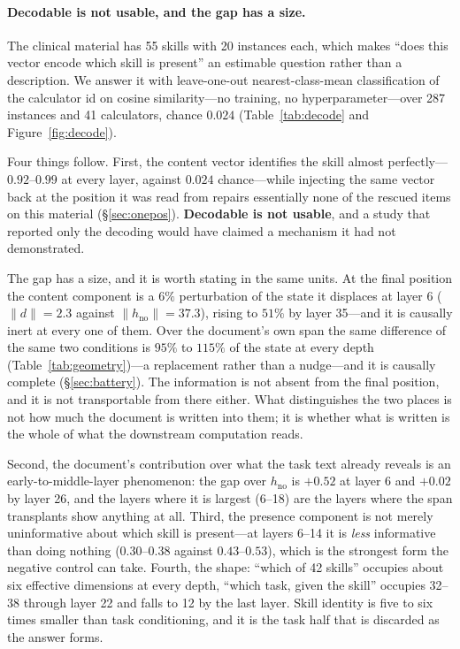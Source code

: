 \documentclass{article}
\newcommand{\dvec}{\ensuremath{d}}
\begin{document}
\paragraph{Decodable is not usable, and the gap has a size.} The clinical
material has 55 skills with
20 instances each, which makes ``does this vector encode which skill is
present'' an estimable question rather than a description. We answer it with
leave-one-out nearest-class-mean classification of the calculator id on cosine
similarity---no training, no hyperparameter---over 287 instances and 41
calculators, chance $0.024$ (Table~\ref{tab:decode} and
Figure~\ref{fig:decode}).





Four things follow. First, the content vector identifies the skill almost
perfectly---$0.92$--$0.99$ at every layer, against $0.024$ chance---while
injecting the same vector back at the position it was read from repairs
essentially none of the rescued items on this material (\S\ref{sec:onepos}).
\textbf{Decodable is not usable}, and a study that reported only the decoding
would have claimed a mechanism it had not demonstrated.

The gap has a size, and it is worth stating in the same units. At the final
position the content component is a $6\%$ perturbation of the state it displaces
at layer 6 ($\|\dvec\|=2.3$ against $\|h_{\text{no}}\|=37.3$), rising to $51\%$
by layer 35---and it is causally inert at every one of them. Over the document's
own span the same difference of the same two conditions is $95\%$ to $115\%$ of
the state at every depth (Table~\ref{tab:geometry})---a replacement rather than a
nudge---and it is causally complete (\S\ref{sec:battery}). The information is not
absent from the final position, and it is not transportable from there either.
What distinguishes the two places is not how much the document is written into
them; it is whether what is written is the whole of what the downstream
computation reads.

Second, the document's contribution over what the task text
already reveals is an early-to-middle-layer phenomenon: the gap over
$h_{\text{no}}$ is $+0.52$ at layer 6 and $+0.02$ by layer 26, and the layers
where it is largest (6--18) are the layers where the span transplants show
anything at all. Third, the presence component is not merely uninformative about which skill is
present---at layers 6--14 it is \emph{less} informative than doing nothing
($0.30$--$0.38$ against $0.43$--$0.53$), which is the strongest form the
negative control can take. Fourth, the shape: ``which of 42 skills'' occupies
about six effective dimensions at every depth, ``which task, given the skill''
occupies 32--38 through layer 22 and falls to 12 by the last layer. Skill
identity is five to six times smaller than task conditioning, and it is the
task half that is discarded as the answer forms.
\end{document}
